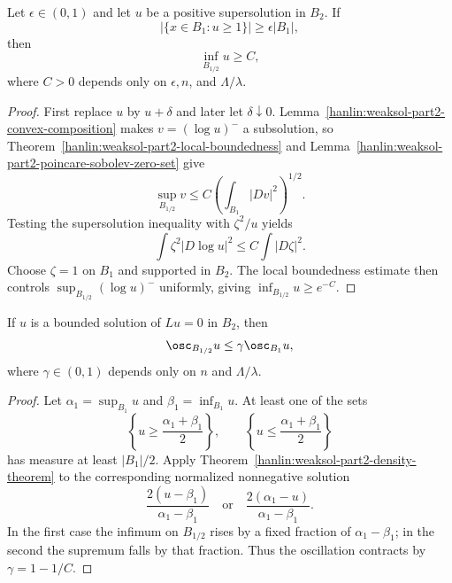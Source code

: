 \begin{theorem}\label{hanlin:weaksol-part2-density-theorem}
Let $\epsilon\in(0,1)$ and let $u$ be a positive supersolution in $B_2$.
If
\[
|\{x\in B_1:u\geq1\}|\geq\epsilon|B_1|,
\]
then
\[
\inf_{B_{1/2}}u\geq C,
\]
where $C>0$ depends only on $\epsilon,n$, and $\Lambda/\lambda$.
\end{theorem}
\begin{proof}
\sketch First replace $u$ by $u+\delta$ and later let $\delta\downarrow0$.
Lemma~\ref{hanlin:weaksol-part2-convex-composition} makes
$v=(\log u)^-$ a subsolution, so
Theorem~\ref{hanlin:weaksol-part2-local-boundedness} and
Lemma~\ref{hanlin:weaksol-part2-poincare-sobolev-zero-set} give
\begin{equation}
\sup_{B_{1/2}}v
\leq C\left(\int_{B_1}|Dv|^2\right)^{1/2}.
\end{equation}
Testing the supersolution inequality with $\zeta^2/u$ yields
\[
\int\zeta^2|D\log u|^2\leq C\int|D\zeta|^2.
\]
Choose $\zeta=1$ on $B_1$ and supported in $B_2$. The local boundedness
estimate then controls
$\sup_{B_{1/2}}(\log u)^-$ uniformly, giving
$\inf_{B_{1/2}}u\geq e^{-C}$.
\end{proof}

\begin{theorem}\label{hanlin:weaksol-part2-oscillation-decay}
If $u$ is a bounded solution of $Lu=0$ in $B_2$, then
\[
\osc_{B_{1/2}}u\leq\gamma\osc_{B_1}u,
\]
where $\gamma\in(0,1)$ depends only on $n$ and $\Lambda/\lambda$.
\end{theorem}
\begin{proof}
\sketch Let $\alpha_1=\sup_{B_1}u$ and $\beta_1=\inf_{B_1}u$. At least
one of the sets
\[
\left\{u\geq\frac{\alpha_1+\beta_1}{2}\right\},
\qquad
\left\{u\leq\frac{\alpha_1+\beta_1}{2}\right\}
\]
has measure at least $|B_1|/2$. Apply
Theorem~\ref{hanlin:weaksol-part2-density-theorem} to the corresponding
normalized nonnegative solution
\[
\frac{2(u-\beta_1)}{\alpha_1-\beta_1}
\quad\text{or}\quad
\frac{2(\alpha_1-u)}{\alpha_1-\beta_1}.
\]
In the first case the infimum on $B_{1/2}$ rises by a fixed fraction of
$\alpha_1-\beta_1$; in the second the supremum falls by that fraction.
Thus the oscillation contracts by $\gamma=1-1/C$.
\end{proof}

